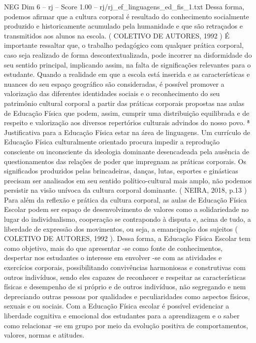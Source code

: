 \begin{textsample}{NEG Dim 6 – rj – Score 1.00 – rj/rj\_ef\_linguagens\_ed\_fis\_1.txt}
Dessa forma, podemos afirmar que a cultura corporal é resultado do conhecimento socialmente produzido e historicamente acumulado pela humanidade e que são retraçados e transmitidos aos alunos na escola. ( COLETIVO DE AUTORES, 1992 ) É importante ressaltar que, o trabalho pedagógico com qualquer prática corporal, caso seja realizado de forma descontextualizada, pode incorrer na disformidade do seu sentido principal, implicando assim, na falta de significações relevantes para o estudante.
Quando a realidade em que a escola está inserida e as características e nuances do seu espaço geográfico são consideradas, é possível promover a valorização das diferentes identidades sociais e o reconhecimento do seu patrimônio cultural corporal a partir das práticas corporais propostas nas aulas de Educação Física que podem, assim, cumprir uma distribuição equilibrada e de respeito e valorização aos diversos repertórios culturais advindos do nosso povo. ⁸ Justificativa para a Educação Física estar na área de linguagens.
Um currículo de Educação Física culturalmente orientado procura impedir a reprodução consciente ou inconsciente da ideologia dominante desencadeada pela ausência de questionamentos das relações de poder que impregnam as práticas corporais.
Os significados produzidos pelas brincadeiras, danças, lutas, esportes e ginásticas precisam ser analisados em seu sentido político-cultural mais amplo, não podemos persistir na visão unívoca da cultura corporal dominante. ( NEIRA, 2018, p.13 ) Para além da reflexão e prática da cultura corporal, as aulas de Educação Física Escolar podem ser espaço de desenvolvimento de valores como a solidariedade no lugar do individualismo, cooperação se contrapondo à disputa e, acima de tudo, a liberdade de expressão dos movimentos, ou seja, a emancipação dos sujeitos ( COLETIVO DE AUTORES, 1992 ).
Dessa forma, a Educação Física Escolar tem como objetivo, mais do que apresentar -se como fonte de conhecimentos, despertar nos estudantes o interesse em envolver -se com as atividades e exercícios corporais, possibilitando convivências harmoniosas e construtivas com outros indivíduos, sendo eles capazes de reconhecer e respeitar as características físicas e desempenho de si próprio e de outros indivíduos, não segregando e nem depreciando outras pessoas por qualidades e peculiaridades como aspectos físicos, sexuais e ou sociais.
Com a Educação Física escolar é possível evidenciar a liberdade cognitiva e emocional dos estudantes para a aprendizagem e o saber como relacionar -se em grupo por meio da evolução positiva de comportamentos, valores, normas e atitudes.

\end{textsample}
